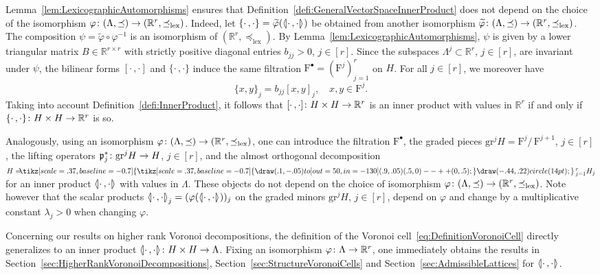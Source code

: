 \documentclass[AHL,Unicode,longabstracts]{cedram}
\newcommand{\symbuptm}{\tikz[scale=.37, baseline=-0.7]{\draw(.1,-.05)to[out=50,in=-130](.9,.05) (.5,0)--++(0,.5);}}
\newcommand{\almorth}{\tikz[scale=.37, baseline=-0.7]{\symbuptm \draw (-.44,.22) circle (14pt);}}
\newcommand{\aplus}{\hspace{-.2cm}\almorth\,}
\newcommand{\llangle}{\mathopen{\langle\mkern -3.1mu\lvert}}
\newcommand{\rrangle}{\mathclose{\rvert\mkern -3.1mu\rangle}}
\newcommand{\highinn}[2]{{\llangle#2\rrangle_{#1}}}
\newcommand{\rquot}[2]{#1/\,#2}
\newcommand{\filter}{\mathrm{F}}
\newcommand{\R}{\mathbb{R}}
\newcommand{\grm}[2]{\mathrm{gr}_{#1}^{#2}}
\newcommand{\proj}{\mathfrak{p}}
\newcommand{\lexeq}{\preceq_{\mathrm{lex}}}
\renewcommand*{\to}{\mathchoice{\longrightarrow}{\rightarrow}{\rightarrow}{\rightarrow}}
\begin{document}
Lemma~\ref{lem:LexicographicAutomorphisms} ensures that Definition~\ref{defi:GeneralVectorSpaceInnerProduct} does not depend on the choice of the isomorphism $\varphi \colon (\Lambda, \preceq) \to (\R^r, \lexeq)$. Indeed, let $\{\cdot \,, \cdot\} = \widetilde \varphi (\highinn{}{\cdot \,, \cdot})$ be obtained from another isomorphism $\widetilde \varphi \colon (\Lambda, \preceq) \to (\R^r, \lexeq)$. The composition $\psi = \widetilde \varphi \circ \varphi^{-1}$ is an isomorphism of $(\R^r, \lexeq)$. By Lemma~\ref{lem:LexicographicAutomorphisms}, $\psi$ is given by a lower triangular matrix $B \in \R^{r \times r}$ with strictly positive diagonal entries $b_{jj} >0$, $j \in [r]$. Since the subspaces $\Lambda^j \subset \R^r$, $j \in [r]$, are invariant under $\psi$, the bilinear forms $[\cdot \,, \cdot]$ and $\{\cdot \,, \cdot \}$ induce the same filtration $\filter^\bullet = (\filter^j)_{j=1}^r$ on $H$. For all $j \in [r]$, we moreover have
\[
\{x,y\}_j = b_{jj} [x,y]_j, \quad x,y \in \filter^j.
\]
Taking into account Definition~\ref{defi:InnerProduct}, it follows that $[\cdot \,, \cdot] \colon H \times H \to \R^r$ is an inner product with values in $\R^r$ if and only if $\{ \cdot\,, \cdot \} \colon H \times H \to \R^r$ is so.




Analogously, using an isomorphism $\varphi \colon (\Lambda, \preceq) \to (\R^r, \lexeq)$, one can introduce the filtration $\filter^\bullet$, the graded pieces $\grm{}{j}H = \rquot{\filter^j}{\filter^{j+1}}$, $j \in [r]$, the lifting operators $\proj_j^\ast \colon \grm{}{j}H \to H$, $j \in [r]$, and the almost orthogonal decomposition $H = \aplus_{j=1}^r H_j$ for an inner product $\highinn{}{\cdot \,, \cdot}$ with values in $\Lambda$. These objects do not depend on the choice of isomorphism $\varphi \colon (\Lambda, \preceq) \to (\R^r, \lexeq)$. Note however that the scalar products $\highinn{j}{\cdot \,, \cdot} = (\varphi(\highinn{}{\cdot \,, \cdot}))_j$ on the graded minors $\grm{}{j}H$, $j \in [r]$, depend on $\varphi$ and change by a multiplicative constant $\lambda_j>0$ when changing $\varphi$.



Concerning our results on higher rank Voronoi decompositions, the definition of the Voronoi cell~\eqref{eq:DefinitionVoronoiCell} directly generalizes to an inner product $\highinn{}{\cdot \,, \cdot} \colon H \times H \to \Lambda$. Fixing an isomorphism $\varphi \colon \Lambda \to \R^r$, one immediately obtains the results in Section~\ref{sec:HigherRankVoronoiDecompositions}, Section~\ref{sec:StructureVoronoiCells} and Section~\ref{sec:AdmissibleLattices} for $\highinn{}{\cdot \,, \cdot}$.
\end{document}
